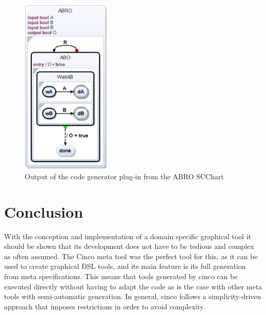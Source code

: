 \begin{figure}[h!]
\includegraphics[width=0.38\textwidth]{bilder/ABROIdentityDiagram.png}
\caption{Output of the code generator plug-in from the ABRO SCChart}
\label{fig:CINCO_CodeGenerator}
\end{figure} 
\section{Conclusion}
With the conception and implementation of a domain specific graphical tool it should be shown that its development does not have to be tedious and complex as often assumed. The Cinco meta tool was the perfect tool for this, as it can be used to create graphical DSL tools, and its main feature is its full generation from meta specifications. This means that tools generated by cinco can be executed directly without having to adapt the code as is the case with other meta tools with semi-automatic generation. In general, cinco follows a simplicity-driven approach that imposes restrictions in order to avoid complexity.

